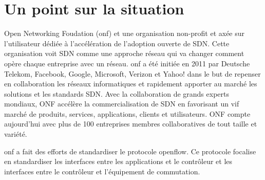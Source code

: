 \clearpage



\section{Un point sur la situation}




Open Networking Foudation (\gls{onf}) et une organisation non-profit et axée sur l'utilisateur dédiée à l'accélération de l'adoption ouverte de SDN. Cette organisation voit SDN comme une approche réseau qui va changer comment opère chaque entreprise avec un réseau.
\gls{onf} a été initiée en 2011 par Deutsche Telekom, Facebook, Google, Microsoft, Verizon et Yahoo! dans le but de repenser en collaboration les réseaux informatiques et rapidement apporter au marché les solutions et les standards SDN. Avec la collaboration de  grands experts mondiaux, ONF accélère la commercialisation de SDN en favorisant un vif marché de produits, services, applications, clients et utilisateurs. ONF compte aujourd'hui avec plus de 100 entreprises membres collaboratives de tout taille et variété. \cite{ONFOverview}

\gls{onf} a fait des efforts de standardiser le protocole \gls{openflow}. Ce protocole focalise en standardiser les interfaces entre les applications et le contrôleur et les interfaces entre le contrôleur et l'équipement de commutation.\cite{SurveySDNArchi}

